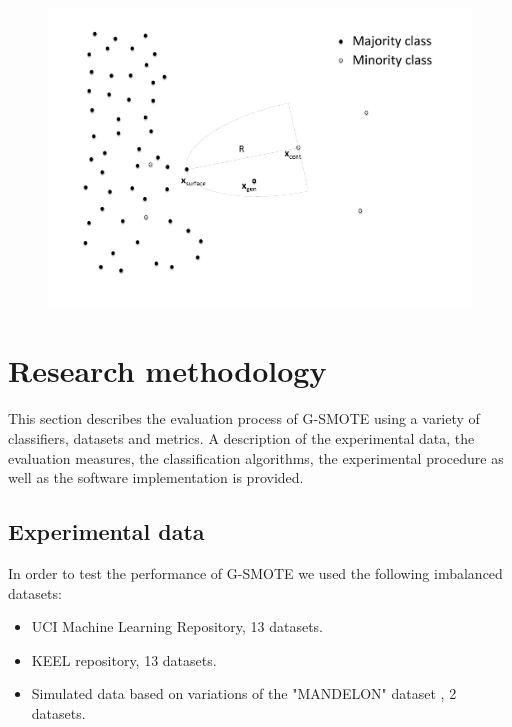 \documentclass[parskip=full]{scrartcl}
\begin{document}
\begin{enumerate}
	\begin{figure}[H]
		\centering
		\includegraphics[width=12cm, keepaspectratio]{./artifacts/fig15}
	\end{figure}

\end{enumerate}

\section{Research methodology}

This section describes the evaluation process of G-SMOTE using a variety of
classifiers, datasets and metrics. A description of the experimental data, the
evaluation measures, the classification algorithms, the experimental procedure
as well as the software implementation is provided.

\subsection{Experimental data}

In order to test the performance of G-SMOTE we used the following imbalanced
datasets:

\begin{itemize}
	
	\renewcommand\labelitemi{--}

	\item UCI Machine Learning Repository, 13 datasets.

	\item KEEL repository, 13 datasets.

	\item Simulated data based on variations of the "MANDELON" dataset
	\cite{Guyon2003}, 2 datasets.

\end{itemize}
\end{document}
